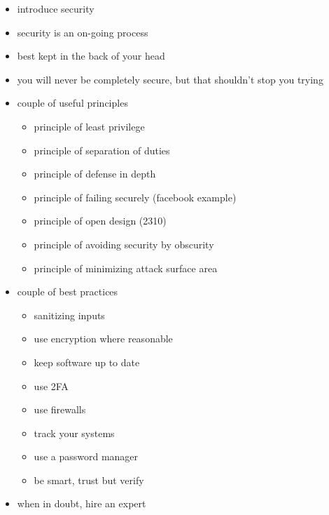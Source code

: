 \documentclass{csse4400}
\begin{document}
\begin{drafting}
\begin{itemize}
    \item introduce security
    \item security is an on-going process
    \item best kept in the back of your head
    \item you will never be completely secure, but that shouldn't stop you trying
    \item couple of useful principles
    \begin{itemize}
        \item principle of least privilege
        \item principle of separation of duties
        \item principle of defense in depth
        \item principle of failing securely (facebook example)
        \item principle of open design (2310)
        \item principle of avoiding security by obscurity
        \item principle of minimizing attack surface area
    \end{itemize}
    \item couple of best practices
    \begin{itemize}
        \item sanitizing inputs
        \item use encryption where reasonable
        \item keep software up to date
        \item use 2FA
        \item use firewalls
        \item track your systems
        \item use a password manager
        \item be smart, trust but verify
    \end{itemize}
    \item when in doubt, hire an expert
\end{itemize}
\end{drafting}




\end{document}
